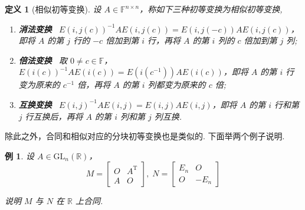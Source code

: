 \documentclass[10pt,openany]{article}
\theoremstyle{thmstyle} %
\theoremstyle{defstyle} %
\newtheorem{definition}[theorem]{定义}
\theoremstyle{prostyle} %
\theoremstyle{exastyle}
\newtheorem{example}[theorem]{例}
\theoremstyle{remstyle}
\newcommand{\T}{^{\text{T}}}
\newcommand{\F}{\mathbb{F}}
\newcommand{\R}{\mathbb{R}}
\newcommand{\n}{^{n \times n}}
\begin{document}
\begin{definition}[相似初等变换]
	设 \( A \in \F\n \)，称如下三种初等变换为相似初等变换,
	\begin{enumerate}[(1)]
		\item \textbf{消法变换} \ \( E(i,j(c))^{-1} A E(i,j(c))= E(i,j(-c)) A E(i,j(c)) \)，即将 \( A \) 的第 \( j \) 行的 \( -c \) 倍加到第 \( i \) 行，再将 \( A \) 的第 \( i \) 列的 \( c \) 倍加到第 \( j \) 列;
		\item \textbf{倍法变换} \ 取 \( 0 \neq c \in \F \)，\( E(i(c))^{-1} A E(i(c))= E(i(c^{-1})) A E(i(c)) \)，即将 \( A \) 的第 \( i \) 行变为原来的 \( c^{-1} \) 倍，再将 \( A \) 的第 \( i \) 列都变为原来的 \( c \) 倍;
		\item \textbf{互换变换} \ \( E(i,j)^{-1} A E(i,j)= E(i,j) A E(i,j) \)，即将 \( A \) 的第 \( i \) 行和第 \( j \) 行互换后，再将 \( A \) 的第 \( i \) 列和第 \( j \) 列互换.
	\end{enumerate}
\end{definition}


除此之外，合同和相似对应的分块初等变换也是类似的. 下面举两个例子说明.

\begin{example}
	设 \( A \in \text{GL}_n(\R) \)，
	\[ M= \begin{bmatrix}
		O & A\T \\
		A & O
	\end{bmatrix}, \; N=\begin{bmatrix}
	E_n & O \\
	O & -E_n
	\end{bmatrix} \]
	
	说明 \( M \) 与 \( N \) 在 \( \R \) 上合同. 
\end{example}
\end{document}
